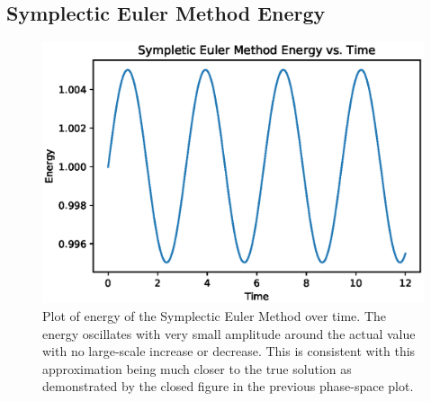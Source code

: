 \documentclass{article}
\begin{document}
\subsection{Symplectic Euler Method Energy}

\begin{figure}[ht]
\centering
\includegraphics[scale=0.35]{symp_energy.eps}
\caption{Plot of energy of the Symplectic Euler Method over time. The energy oscillates with very small amplitude around the actual value with no large-scale increase or decrease. This is consistent with this approximation being much closer to the true solution as demonstrated by the closed figure in the previous phase-space plot.}
\label{fig:sympenergy}
\end{figure}
\end{document}
